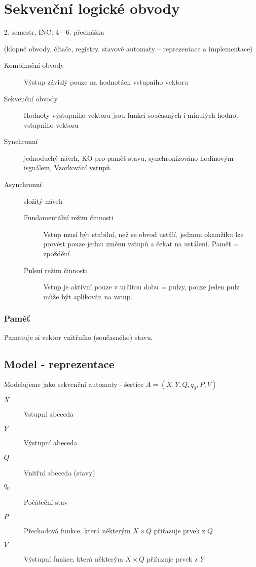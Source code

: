 \documentclass[a4paper, 11pt]{report}
\begin{document}
\chapter{Sekvenční logické obvody } \label{cha:3}

2. semestr, INC, 4 - 6. přednáška

(klopné obvody, čítače, registry, stavové automaty – reprezentace a implementace)

\begin{description}
	\item[Kombinační obvody] Výstup závislý pouze na hodnotách vstupního vektoru
	\item[Sekvenční obvody] Hodnoty výstupního vektoru jsou funkcí současných i minulých hodnot vstupního vektoru
\end{description}

\begin{description}
	\item[Synchronní] jednoduchý návrh, KO pro paměť stavu, synchronizováno hodinovým isgnálem, Vzorkování vstupů.
	\item[Asynchronní] složitý návrh
	\begin{description}
		\item[Fundamentální režim činnosti] Vstup musí být stabilní, než se obvod ustálí, jednom okamžiku lze provést pouze jednu změnu vstupů a čekat na ustálení. Paměť = zpoždění.
		\item[Pulsní režim činnosti] Vstup je aktivní pouze v určitou dobu = pulzy, pouze jeden pulz může být aplikován na vstup.
	\end{description}
\end{description}


\subsection{Paměť}
Pamatuje si vektor vnitřního (současného) stavu.

\section{Model - reprezentace}

Modelujeme jako sekvenční automaty - šestice $A = (X, Y, Q, q_0, P, V)$
\begin{description}
	\item[$X$] Vstupní abeceda
	\item[$Y$] Výstupní abeceda
	\item[$Q$] Vnitřní abeceda (stavy)
	\item[$q_0$] Počáteční stav
	\item[$P$] Přechodová funkce, která některým $X \times Q$ přiřazuje prvek z $Q$
	\item[$V$] Výstupní funkce, která některým $X \times Q$ přiřazuje prvek z $Y$
\end{description}
\end{document}

